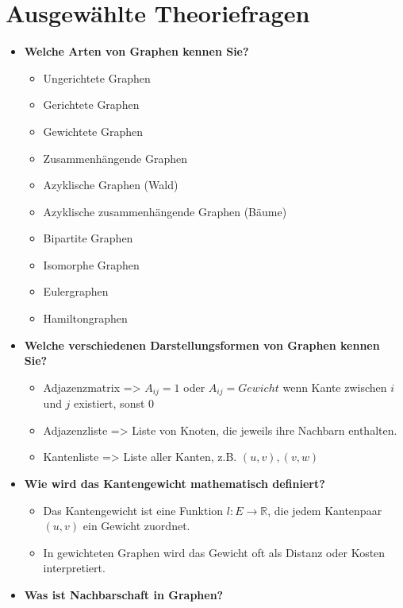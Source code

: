 \documentclass[12pt]{scrartcl}
\begin{document}
\section{Ausgewählte Theoriefragen}
\pagebreak

\begin{itemize}
    \item \textbf{Welche Arten von Graphen kennen Sie?}
          \begin{itemize}
              \item Ungerichtete Graphen
              \item Gerichtete Graphen
              \item Gewichtete Graphen
              \item Zusammenhängende Graphen
              \item Azyklische Graphen (Wald)
              \item Azyklische zusammenhängende Graphen (Bäume)
              \item Bipartite Graphen
              \item Isomorphe Graphen
              \item Eulergraphen
              \item Hamiltongraphen
          \end{itemize}
    \item \textbf{Welche verschiedenen Darstellungsformen von Graphen kennen Sie?}
          \begin{itemize}
              \item Adjazenzmatrix => $A_{ij} = 1$ oder $A_{ij} = Gewicht$ wenn Kante zwischen $i$ und $j$ existiert, sonst $0$
              \item Adjazenzliste => Liste von Knoten, die jeweils ihre Nachbarn enthalten.
              \item Kantenliste => Liste aller Kanten, z.B. ${(u, v), (v, w)}$
          \end{itemize}
    \item \textbf{Wie wird das Kantengewicht mathematisch definiert?}
          \begin{itemize}
              \item Das Kantengewicht ist eine Funktion $l: E \to \mathbb{R}$, die jedem Kantenpaar $(u, v)$ ein Gewicht zuordnet.
              \item In gewichteten Graphen wird das Gewicht oft als Distanz oder Kosten interpretiert.
          \end{itemize}
    \item \textbf{Was ist Nachbarschaft in Graphen?}

\end{itemize}
\end{document}
